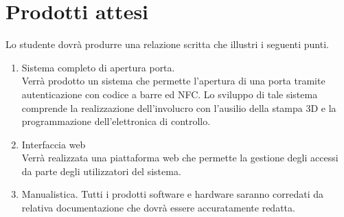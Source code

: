 \section*{Prodotti attesi}
Lo studente dovrà produrre una relazione scritta che illustri i seguenti punti.
\begin{enumerate}
    \item Sistema completo di apertura porta. \\
    Verrà prodotto un sistema che permette l'apertura di una porta tramite autenticazione con codice a barre ed NFC.
    Lo sviluppo di tale sistema comprende la realizzazione dell'involucro con l'ausilio della stampa 3D e la programmazione dell'elettronica di controllo.
    
    \item Interfaccia web \\
    Verrà realizzata una piattaforma web che permette la gestione degli accessi da parte degli utilizzatori del sistema.
    
    \item Manualistica.
    Tutti i prodotti software e hardware saranno corredati da relativa documentazione che dovrà essere accuratamente redatta.
\end{enumerate}

